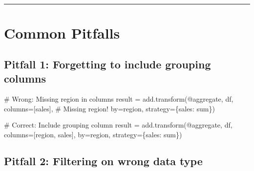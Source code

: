 \documentclass[
  letterpaper,
]{scrbook}
\newenvironment{Shaded}{\begin{snugshade}}{\end{snugshade}}
\newcommand{\CommentTok}[1]{\textcolor[rgb]{0.37,0.37,0.37}{#1}}
\newcommand{\NormalTok}[1]{\textcolor[rgb]{0.00,0.23,0.31}{#1}}
\newcommand{\OperatorTok}[1]{\textcolor[rgb]{0.37,0.37,0.37}{#1}}
\newcommand{\StringTok}[1]{\textcolor[rgb]{0.13,0.47,0.30}{#1}}
\begin{document}
\begin{center}\rule{0.5\linewidth}{0.5pt}\end{center}

\section{Common Pitfalls}\label{common-pitfalls}

\subsection{Pitfall 1: Forgetting to include grouping
columns}\label{pitfall-1-forgetting-to-include-grouping-columns}

\begin{Shaded}
\begin{Highlighting}[]
\CommentTok{\# Wrong: Missing \textquotesingle{}region\textquotesingle{} in columns}
\NormalTok{result }\OperatorTok{=}\NormalTok{ add.transform(}\StringTok{\textquotesingle{}@aggregate\textquotesingle{}}\NormalTok{, df,}
\NormalTok{                       columns}\OperatorTok{=}\NormalTok{[}\StringTok{\textquotesingle{}sales\textquotesingle{}}\NormalTok{],  }\CommentTok{\# Missing \textquotesingle{}region\textquotesingle{}!}
\NormalTok{                       by}\OperatorTok{=}\StringTok{\textquotesingle{}region\textquotesingle{}}\NormalTok{,}
\NormalTok{                       strategy}\OperatorTok{=}\NormalTok{\{}\StringTok{\textquotesingle{}sales\textquotesingle{}}\NormalTok{: }\StringTok{\textquotesingle{}sum\textquotesingle{}}\NormalTok{\})}

\CommentTok{\# Correct: Include grouping column}
\NormalTok{result }\OperatorTok{=}\NormalTok{ add.transform(}\StringTok{\textquotesingle{}@aggregate\textquotesingle{}}\NormalTok{, df,}
\NormalTok{                       columns}\OperatorTok{=}\NormalTok{[}\StringTok{\textquotesingle{}region\textquotesingle{}}\NormalTok{, }\StringTok{\textquotesingle{}sales\textquotesingle{}}\NormalTok{],}
\NormalTok{                       by}\OperatorTok{=}\StringTok{\textquotesingle{}region\textquotesingle{}}\NormalTok{,}
\NormalTok{                       strategy}\OperatorTok{=}\NormalTok{\{}\StringTok{\textquotesingle{}sales\textquotesingle{}}\NormalTok{: }\StringTok{\textquotesingle{}sum\textquotesingle{}}\NormalTok{\})}
\end{Highlighting}
\end{Shaded}

\subsection{Pitfall 2: Filtering on wrong data
type}\label{pitfall-2-filtering-on-wrong-data-type}
\end{document}
